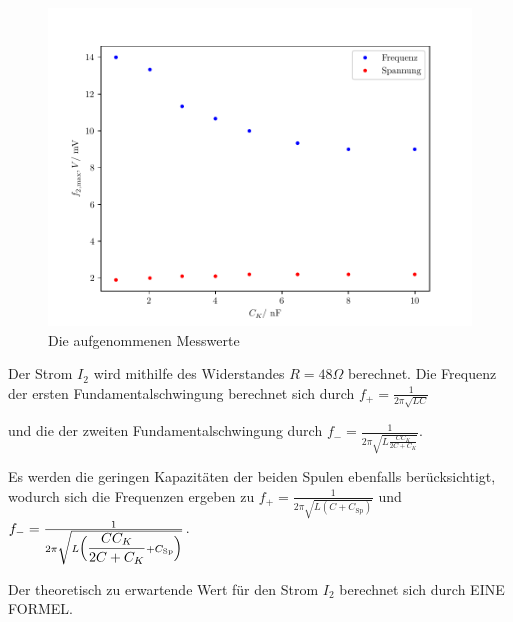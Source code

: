 \begin{figure}
  \centering
  \includegraphics{freq2.pdf}
  \caption{Die aufgenommenen Messwerte}
  \label{fig:freq2}
\end{figure}


Der Strom $I_2$ wird mithilfe des Widerstandes $R=48\Omega$ berechnet.
Die Frequenz der ersten Fundamentalschwingung berechnet sich durch %
$f_+ = \frac{1}{2\pi\sqrt{LC}}$ 

und die der zweiten Fundamentalschwingung durch 
$f_- = \frac{1}{2\pi\sqrt{L\frac{CC_K}{2C+C_K}}}$. 

Es werden die geringen Kapazitäten der beiden Spulen ebenfalls berücksichtigt, wodurch sich die Frequenzen ergeben zu
$f_+ = \frac{1}{2\pi\sqrt{L(C + C_\text{Sp})}}$ und $f_- = \frac{1}{2\pi\sqrt{L\Bigl(\dfrac{CC_K}{2C+C_K} + C_\text{Sp}\Bigr)}}$. 

Der theoretisch zu erwartende Wert für den Strom $I_2$ berechnet sich durch EINE FORMEL. 


